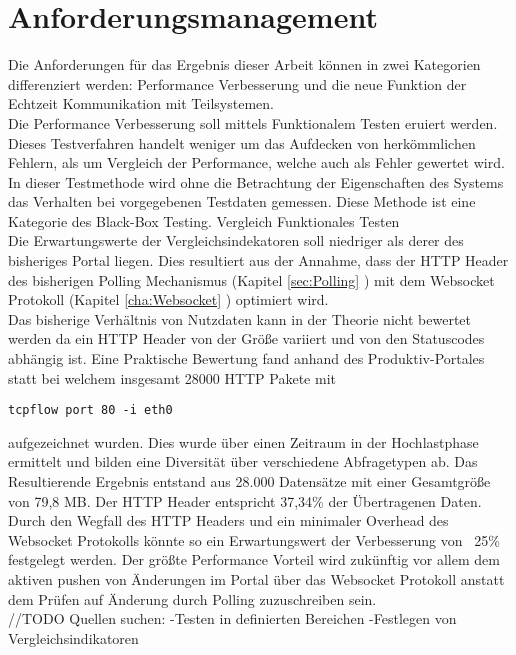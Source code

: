 \section{Anforderungsmanagement}
\label{sec:Anforderungsmanagement}
Die Anforderungen für das Ergebnis dieser Arbeit können in zwei Kategorien differenziert werden: Performance Verbesserung und die neue Funktion der Echtzeit Kommunikation mit Teilsystemen.\\ \newline
Die Performance Verbesserung soll mittels Funktionalem Testen eruiert werden. Dieses Testverfahren handelt weniger um das Aufdecken von herkömmlichen Fehlern, als um Vergleich der Performance, welche auch als Fehler gewertet wird. In dieser Testmethode wird ohne die Betrachtung der Eigenschaften des Systems das Verhalten bei vorgegebenen Testdaten gemessen. Diese Methode ist eine Kategorie des Black-Box Testing. Vergleich Funktionales Testen \cite[\textit{Testmethoden und tools in der modellbasierten Funktionsentwicklung}]{Testmethoden und tools in der modellbasierten Funktionsentwicklung}\\
Die Erwartungswerte der Vergleichsindekatoren soll niedriger als derer des bisheriges Portal liegen. Dies resultiert aus der Annahme, dass der HTTP Header des bisherigen Polling Mechanismus (Kapitel \ref{sec:Polling} \textit{}) mit dem Websocket Protokoll (Kapitel \ref{cha:Websocket} \textit{}) optimiert wird.\\ Das bisherige Verhältnis von Nutzdaten kann in der Theorie nicht bewertet werden da ein HTTP Header von der Größe variiert und von den Statuscodes abhängig ist. Eine Praktische Bewertung fand anhand des Produktiv-Portales statt bei welchem insgesamt 28000 HTTP Pakete mit 
\begin{lstlisting}
tcpflow port 80 -i eth0
\end{lstlisting}
aufgezeichnet wurden. Dies wurde über einen Zeitraum in der Hochlastphase ermittelt und bilden eine Diversität über verschiedene Abfragetypen ab. Das Resultierende Ergebnis entstand aus 28.000 Datensätze mit einer Gesamtgröße von 79,8 MB. Der HTTP Header entspricht 37,34\% der Übertragenen Daten. Durch den Wegfall des HTTP Headers und ein minimaler Overhead des Websocket Protokolls könnte so ein Erwartungswert der Verbesserung von ~25\% festgelegt werden. Der größte Performance Vorteil wird zukünftig vor allem dem aktiven pushen von Änderungen im Portal über das Websocket Protokoll anstatt dem Prüfen auf Änderung durch Polling zuzuschreiben sein.
\\//TODO
Quellen suchen:
-Testen in definierten Bereichen
-Festlegen von Vergleichsindikatoren



